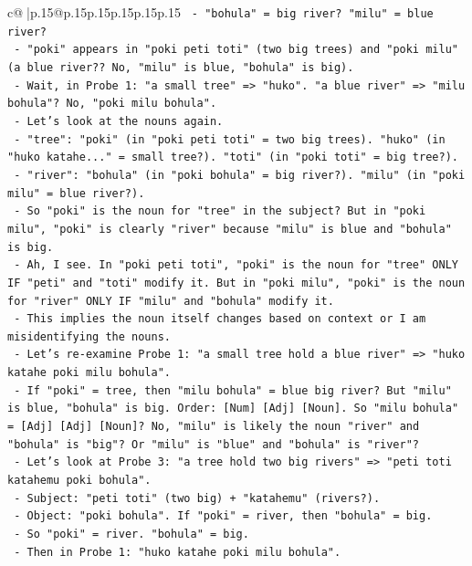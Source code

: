 \documentclass{article}
\begin{document}
{\begin{supertabular}{c@{$\;$}|p{.15\linewidth}@{}p{.15\linewidth}p{.15\linewidth}p{.15\linewidth}p{.15\linewidth}p{.15\linewidth}}
{{{\texttt{        {-} "bohula" = big river? "milu" = blue river?} \\
\texttt{        {-} "poki" appears in "poki peti toti" (two big trees) and "poki milu" (a blue river?? No, "milu" is blue, "bohula" is big).} \\
\texttt{        {-} Wait, in Probe 1: "a small tree" => "huko". "a blue river" => "milu bohula"? No, "poki milu bohula".} \\
\texttt{        {-} Let's look at the nouns again.} \\
\texttt{        {-} "tree": "poki" (in "poki peti toti" = two big trees). "huko" (in "huko katahe..." = small tree?). "toti" (in "poki toti" = big tree?).} \\
\texttt{        {-} "river": "bohula" (in "poki bohula" = big river?). "milu" (in "poki milu" = blue river?).} \\
\texttt{        {-} So "poki" is the noun for "tree" in the subject? But in "poki milu", "poki" is clearly "river" because "milu" is blue and "bohula" is big.} \\
\texttt{        {-} Ah, I see. In "poki peti toti", "poki" is the noun for "tree" ONLY IF "peti" and "toti" modify it. But in "poki milu", "poki" is the noun for "river" ONLY IF "milu" and "bohula" modify it.} \\
\texttt{        {-} This implies the noun itself changes based on context or I am misidentifying the nouns.} \\
\texttt{        {-} Let's re{-}examine Probe 1: "a small tree hold a blue river" => "huko katahe poki milu bohula".} \\
\texttt{          {-} If "poki" = tree, then "milu bohula" = blue big river? But "milu" is blue, "bohula" is big. Order: {[}Num{]} {[}Adj{]} {[}Noun{]}. So "milu bohula" = {[}Adj{]} {[}Adj{]} {[}Noun{]}? No, "milu" is likely the noun "river" and "bohula" is "big"? Or "milu" is "blue" and "bohula" is "river"?} \\
\texttt{          {-} Let's look at Probe 3: "a tree hold two big rivers" => "peti toti katahemu poki bohula".} \\
\texttt{            {-} Subject: "peti toti" (two big) + "katahemu" (rivers?).} \\
\texttt{            {-} Object: "poki bohula". If "poki" = river, then "bohula" = big.} \\
\texttt{            {-} So "poki" = river. "bohula" = big.} \\
\texttt{            {-} Then in Probe 1: "huko katahe poki milu bohula".} \\
}}}
\end{supertabular}}
\end{document}
